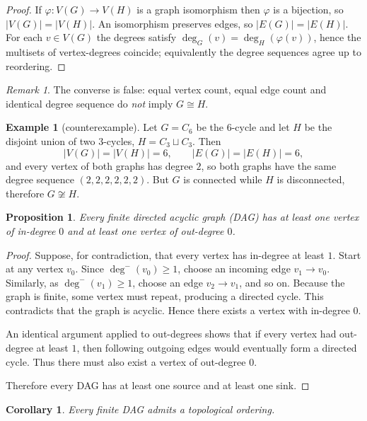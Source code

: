 \documentclass{article}
\theoremstyle{plain}
\newtheorem{proposition}{Proposition}
\newtheorem{corollary}{Corollary}
\theoremstyle{definition}
\newtheorem{example}{Example}
\theoremstyle{remark}
\newtheorem{remark}{Remark}
\begin{document}
\begin{proof}
If $\varphi:V(G)\to V(H)$ is a graph isomorphism then $\varphi$ is a bijection,
so $|V(G)|=|V(H)|$. An isomorphism preserves edges, so $|E(G)|=|E(H)|$. For
each $v\in V(G)$ the degrees satisfy $\deg_G(v)=\deg_H(\varphi(v))$, hence
the multisets of vertex-degrees coincide; equivalently the degree sequences
agree up to reordering.
\end{proof}

\begin{remark}
The converse is false: equal vertex count, equal edge count and identical
degree sequence do \emph{not} imply $G\cong H$.
\end{remark}

\begin{example}[counterexample]
Let $G=C_6$ be the $6$-cycle and let $H$ be the disjoint union of two
$3$-cycles, $H=C_3\sqcup C_3$. Then
\[
|V(G)|=|V(H)|=6,\qquad |E(G)|=|E(H)|=6,
\]
and every vertex of both graphs has degree $2$, so both graphs have the same
degree sequence $(2,2,2,2,2,2)$. But $G$ is connected while $H$ is
disconnected, therefore $G\not\cong H$.
\end{example}

\begin{proposition}
Every finite directed acyclic graph (DAG) has at least one vertex of
in-degree \(0\) and at least one vertex of out-degree \(0\).
\end{proposition}

\begin{proof}
Suppose, for contradiction, that every vertex has in-degree at least \(1\).
Start at any vertex \(v_0\). Since \(\deg^-(v_0)\ge 1\), choose an incoming
edge \(v_1 \to v_0\). Similarly, as \(\deg^-(v_1)\ge 1\), choose an edge
\(v_2 \to v_1\), and so on. Because the graph is finite, some vertex must
repeat, producing a directed cycle. This contradicts that the graph is acyclic.
Hence there exists a vertex with in-degree \(0\).

An identical argument applied to out-degrees shows that if every vertex had
out-degree at least \(1\), then following outgoing edges would eventually form
a directed cycle. Thus there must also exist a vertex of out-degree \(0\).

Therefore every DAG has at least one source and at least one sink.
\end{proof}
\begin{corollary}
Every finite DAG admits a topological ordering.
\end{corollary}
\end{document}
